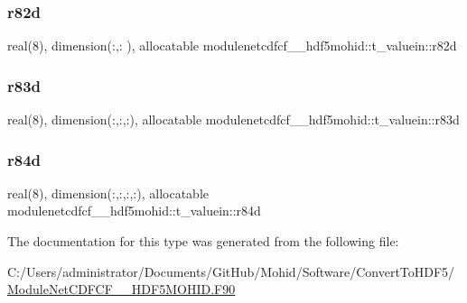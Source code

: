 \subsubsection{\texorpdfstring{r82d}{r82d}}
{\footnotesize\ttfamily real(8), dimension(\+:,\+:  ), allocatable modulenetcdfcf\+\_\+\_\+hdf5mohid\+::t\+\_\+valuein\+::r82d\hspace{0.3cm}{\ttfamily [private]}}

\mbox{\label{structmodulenetcdfcf__2__hdf5mohid_1_1t__valuein_a5998869bffbd04f1ddb7baf654346a97}} 
\subsubsection{\texorpdfstring{r83d}{r83d}}
{\footnotesize\ttfamily real(8), dimension(\+:,\+:,\+:), allocatable modulenetcdfcf\+\_\+\_\+hdf5mohid\+::t\+\_\+valuein\+::r83d\hspace{0.3cm}{\ttfamily [private]}}

\mbox{\label{structmodulenetcdfcf__2__hdf5mohid_1_1t__valuein_a57db5d8364de9f936fd4a12614a3b20e}} 
\subsubsection{\texorpdfstring{r84d}{r84d}}
{\footnotesize\ttfamily real(8), dimension(\+:,\+:,\+:,\+:), allocatable modulenetcdfcf\+\_\+\_\+hdf5mohid\+::t\+\_\+valuein\+::r84d\hspace{0.3cm}{\ttfamily [private]}}



The documentation for this type was generated from the following file\+:\begin{DoxyCompactItemize}
\item 
C\+:/\+Users/administrator/\+Documents/\+Git\+Hub/\+Mohid/\+Software/\+Convert\+To\+H\+D\+F5/\mbox{\hyperlink{_module_net_c_d_f_c_f__2___h_d_f5_m_o_h_i_d_8_f90}{Module\+Net\+C\+D\+F\+C\+F\+\_\+\_\+\+H\+D\+F5\+M\+O\+H\+I\+D.\+F90}}\end{DoxyCompactItemize}
